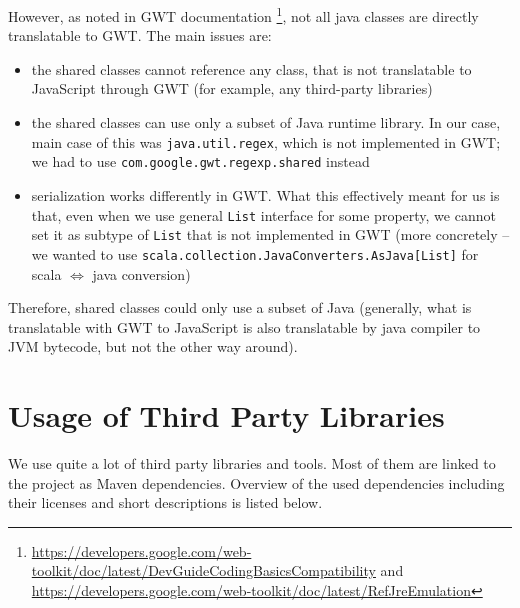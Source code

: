 However, as noted in GWT documentation \footnote{\url{https://developers.google.com/web-toolkit/doc/latest/DevGuideCodingBasicsCompatibility} and \url{https://developers.google.com/web-toolkit/doc/latest/RefJreEmulation}}, not all java classes are directly translatable to GWT. The main issues are:

\begin{itemize}
\item the shared classes cannot reference any class, that is not translatable to JavaScript through GWT (for example, any third-party libraries)
\item the shared classes can use only a subset of Java runtime library. In our case, main case of this was \texttt{java.util.regex}, which is not implemented in GWT; we had to use \texttt{com.google.gwt.regexp.shared} instead
\item serialization works differently in GWT. What this effectively meant for us is that, even when we use general \texttt{List} interface for some property, we cannot set it as subtype of \texttt{List} that is not implemented in GWT (more concretely -- we wanted to use \texttt{scala.collection.JavaConverters.AsJava[List]} for scala $\Leftrightarrow$ java conversion)
\end{itemize}

Therefore, shared classes could only use a subset of Java (generally, what is translatable with GWT to JavaScript is also translatable by java compiler to JVM bytecode, but not the other way around).

\section{Usage of Third Party Libraries}

We use quite a lot of third party libraries and tools. Most of them are linked to the project as Maven dependencies. Overview of the used dependencies including their licenses and short descriptions is listed below.

